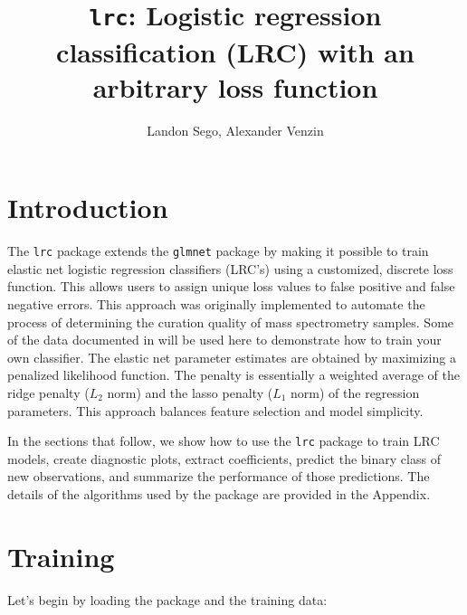 \documentclass{article}
\begin{document}
 


\title{{\tt lrc}: Logistic regression classification (LRC) with an arbitrary loss function\\}
\author{Landon Sego, Alexander Venzin}
\maketitle

\section{Introduction}

The {\tt lrc} package extends the {\tt glmnet} package by making it possible to train elastic net logistic 
regression classifiers (LRC's) using a customized, discrete loss function.  This allows users to assign unique 
loss values to false positive and false negative errors. This approach was originally implemented to automate the
process of determining the curation quality of mass spectrometry samples. Some of the data documented in 
\cite{thepaper} will be used here to demonstrate how to train your own classifier. The elastic net parameter
estimates are obtained by maximizing a penalized likelihood function. The penalty is essentially a weighted average
of the ridge penalty ($L_2$ norm) and the lasso penalty ($L_1$ norm) of the regression parameters.  This
approach balances feature selection and model simplicity. 

In the sections that follow, we show how to use the {\tt lrc} package to train LRC models, create diagnostic plots,
extract coefficients, predict the binary class of new observations, and summarize the performance of those
predictions. The details of the algorithms used by the package are provided in the Appendix.

\section{Training}

Let's begin by loading the package and the training data:
\end{document}
